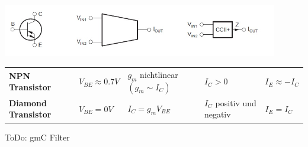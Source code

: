 \begin{center}
	\includegraphics[width=12cm]{images/op_diamond}
\end{center}

\begin{tabular}{lllll}
	\textbf{NPN Transistor} & $V_{BE} \approx 0.7V$ & 
		$g_m$ nichtlinear $(g_m \sim I_C)$ & $I_C > 0$ & $I_E \approx-I_C$ \\
	\textbf{Diamond Transistor} & $V_{BE} = 0V$ & $I_C = g_m V_{BE}$ &
		$I_C$ positiv und negativ & $I_E = I_C$ \\
\end{tabular}

ToDo: gmC Filter